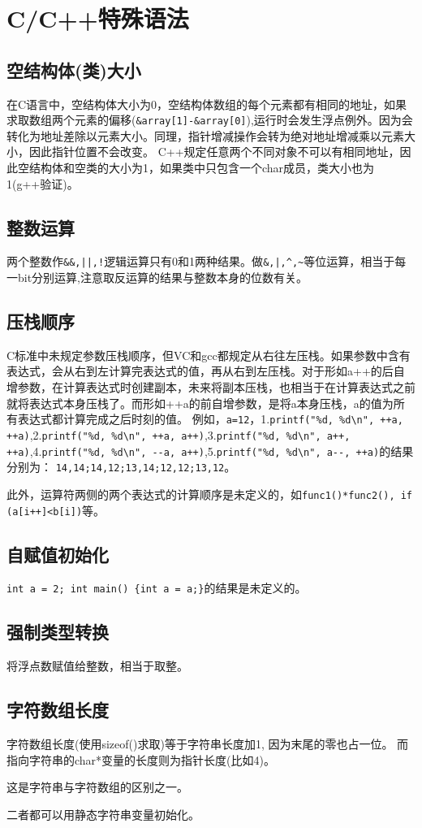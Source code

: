 \section{C/C++特殊语法}

\subsection{空结构体(类)大小}
在C语言中，空结构体大小为0，空结构体数组的每个元素都有相同的地址，如果求取数组两个元素的偏移(\verb|&array[1]-&array[0]|),运行时会发生浮点例外。因为会转化为地址差除以元素大小。同理，指针增减操作会转为绝对地址增减乘以元素大小，因此指针位置不会改变。
C++规定任意两个不同对象不可以有相同地址，因此空结构体和空类的大小为1，如果类中只包含一个char成员，类大小也为1(g++验证)。

\subsection{整数运算}
两个整数作\verb+&&,||,!+逻辑运算只有0和1两种结果。做\verb+&,|,^,~+等位运算，相当于每一bit分别运算,注意取反运算的结果与整数本身的位数有关。

\subsection{压栈顺序}
C标准中未规定参数压栈顺序，但VC和gcc都规定从右往左压栈。如果参数中含有表达式，会从右到左计算完表达式的值，再从右到左压栈。对于形如a++的后自增参数，在计算表达式时创建副本，未来将副本压栈，也相当于在计算表达式之前就将表达式本身压栈了。而形如++a的前自增参数，是将a本身压栈，a的值为所有表达式都计算完成之后时刻的值。
例如，\verb|a=12|，1.\verb|printf("%d, %d\n", ++a, ++a)|,2.\verb|printf("%d, %d\n", ++a, a++)|,3.\verb|printf("%d, %d\n", a++, ++a)|,4.\verb|printf("%d, %d\n", --a, a++)|,5.\verb|printf("%d, %d\n", a--, ++a)|的结果分别为：
\verb|14,14;14,12;13,14;12,12;13,12|。

此外，运算符两侧的两个表达式的计算顺序是未定义的，如\verb|func1()*func2(), if (a[i++]<b[i])|等。

\subsection{自赋值初始化}
\verb+int a = 2; int main() {int a = a;}+的结果是未定义的。


\subsection{强制类型转换}
将浮点数赋值给整数，相当于取整。

\subsection{字符数组长度}
字符数组长度(使用sizeof()求取)等于字符串长度加1, 因为末尾的零也占一位。
而指向字符串的char*变量的长度则为指针长度(比如4)。

这是字符串与字符数组的区别之一。

二者都可以用静态字符串变量初始化。


